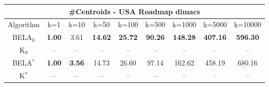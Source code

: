 \begin{tabular}{c|cccccccc}\toprule
\multicolumn{9}{c}{#Centroids - USA Roadmap dimacs}\\ \midrule
Algorithm & k=1 & k=10 & k=50 & k=100 & k=500 & k=1000 & k=5000 & k=10000 \\ \midrule
BELA$_0$ & \textbf{1.00} & 3.61 & \textbf{14.62} & \textbf{25.72} & \textbf{90.26} & \textbf{148.28} & \textbf{407.16} & \textbf{596.30} \\
K$_0$ & -- & -- & -- & -- & -- & -- & -- & -- \\
BELA$^*$ & \textbf{1.00} & \textbf{3.56} & 14.73 & 26.60 & 97.14 & 162.62 & 458.19 & 680.16 \\
K$^*$ & -- & -- & -- & -- & -- & -- & -- & -- \\ \bottomrule 
\end{tabular}
